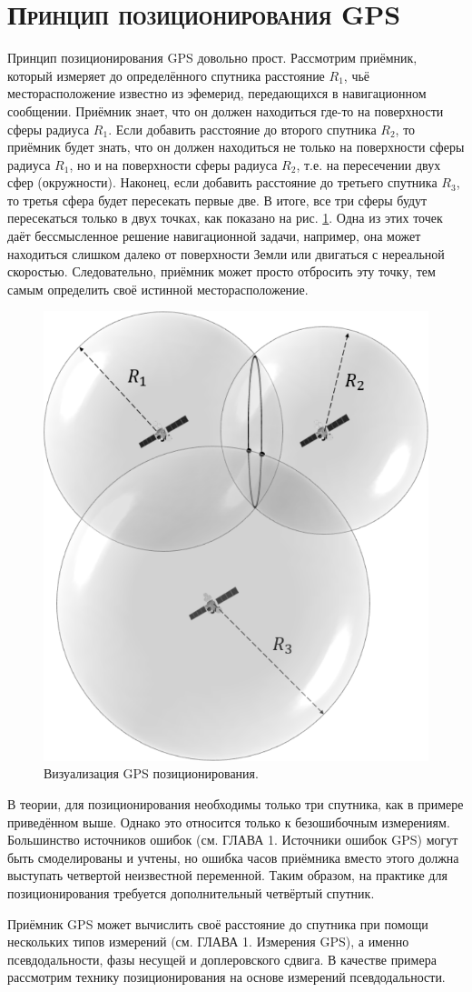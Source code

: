 \section{\textsc{Принцип позиционирования GPS}}

Принцип позиционирования GPS довольно прост.
Рассмотрим приёмник, который измеряет до определённого спутника расстояние $R_1$, чьё месторасположение известно из эфемерид, передающихся в навигационном сообщении.
Приёмник знает, что он должен находиться где-то на поверхности сферы радиуса $R_1$.
Если добавить расстояние до второго спутника $R_2$, то приёмник будет знать, что он должен находиться не только на поверхности сферы радиуса $R_1$, но и на поверхности сферы радиуса $R_2$, т.е. на пересечении двух сфер (окружности).
Наконец, если добавить расстояние до третьего спутника $R_3$, то третья сфера будет пересекать первые две.
В итоге, все три сферы будут пересекаться только в двух точках, как показано на рис. \ref{fig-positioning}.
Одна из этих точек даёт бессмысленное решение навигационной задачи, например, она может находиться слишком далеко от поверхности Земли или двигаться с нереальной скоростью.
Следовательно, приёмник может просто отбросить эту точку, тем самым определить своё истинной месторасположение. 
\vspace{1em}
\begin{figure}[h]
\centering    
\includegraphics[width=0.3\linewidth]{fig/positioning.png}    
\caption{Визуализация GPS позиционирования.}
\label{fig-positioning}      
\end{figure}

В теории, для позиционирования необходимы только три спутника, как в примере приведённом выше.
Однако это относится только к безошибочным измерениям.
Большинство источников ошибок (см. ГЛАВА 1. Источники ошибок GPS) могут быть смоделированы и учтены, но ошибка часов приёмника вместо этого должна выступать четвертой неизвестной переменной.
Таким образом, на практике для позиционирования требуется дополнительный четвёртый спутник.

Приёмник GPS может вычислить своё расстояние до спутника при помощи нескольких типов измерений (см. ГЛАВА 1. Измерения GPS), а именно псевдодальности, фазы несущей и доплеровского сдвига.
В качестве примера рассмотрим технику позиционирования на основе измерений псевдодальности.

